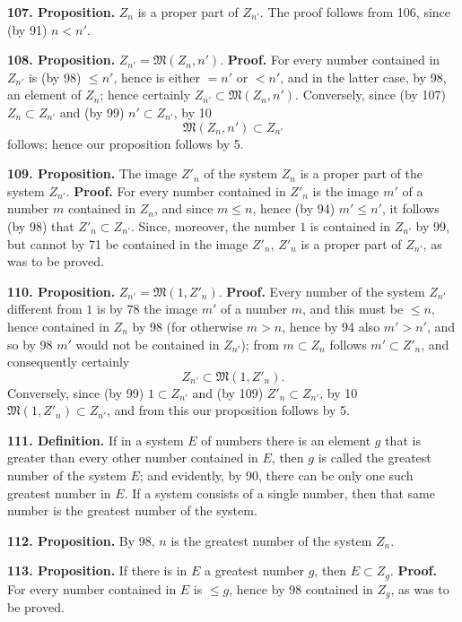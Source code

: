 \documentclass[11pt]{article}
\newcommand{\Mf}{\mathfrak{M}}
\newcommand{\partof}{\mathrel{\subset}}
\begin{document}
\noindent\textbf{107. Proposition.} $Z_n$ is a proper part of $Z_{n'}$. The proof follows from 106, since (by 91) $n<n'$.

\noindent\textbf{108. Proposition.} $Z_{n'}=\Mf(Z_n,n')$. \textbf{Proof.} For every number contained in $Z_{n'}$ is (by 98) $\le n'$, hence is either $=n'$ or $<n'$, and in the latter case, by 98, an element of $Z_n$; hence certainly $Z_{n'}\partof\Mf(Z_n,n')$. Conversely, since (by 107) $Z_n\partof Z_{n'}$ and (by 99) $n'\partof Z_{n'}$, by 10
\[
\Mf(Z_n,n')\partof Z_{n'}
\]
follows; hence our proposition follows by 5.

\noindent\textbf{109. Proposition.} The image $Z'_n$ of the system $Z_n$ is a proper part of the system $Z_{n'}$. \textbf{Proof.} For every number contained in $Z'_n$ is the image $m'$ of a number $m$ contained in $Z_n$, and since $m\le n$, hence (by 94) $m'\le n'$, it follows (by 98) that $Z'_n\partof Z_{n'}$. Since, moreover, the number $1$ is contained in $Z_{n'}$ by 99, but cannot by 71 be contained in the image $Z'_n$, $Z'_n$ is a proper part of $Z_{n'}$, as was to be proved.

\noindent\textbf{110. Proposition.} $Z_{n'}=\Mf(1,Z'_n)$. \textbf{Proof.} Every number of the system $Z_{n'}$ different from $1$ is by 78 the image $m'$ of a number $m$, and this must be $\le n$, hence contained in $Z_n$ by 98 (for otherwise $m>n$, hence by 94 also $m'>n'$, and so by 98 $m'$ would not be contained in $Z_{n'}$); from $m\partof Z_n$ follows $m'\partof Z'_n$, and consequently certainly
\[
Z_{n'}\partof\Mf(1,Z'_n).
\]
Conversely, since (by 99) $1\partof Z_{n'}$ and (by 109) $Z'_n\partof Z_{n'}$, by 10 $\Mf(1,Z'_n)\partof Z_{n'}$, and from this our proposition follows by 5.

\noindent\textbf{111. Definition.} If in a system $E$ of numbers there is an element $g$ that is greater than every other number contained in $E$, then $g$ is called the greatest number of the system $E$; and evidently, by 90, there can be only one such greatest number in $E$. If a system consists of a single number, then that same number is the greatest number of the system.

\noindent\textbf{112. Proposition.} By 98, $n$ is the greatest number of the system $Z_n$.

\noindent\textbf{113. Proposition.} If there is in $E$ a greatest number $g$, then $E\partof Z_g$. \textbf{Proof.} For every number contained in $E$ is $\le g$, hence by 98 contained in $Z_g$, as was to be proved.
\end{document}
